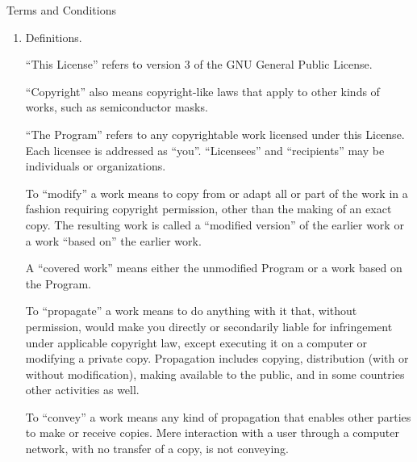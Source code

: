 \documentclass[10pt]{article}
\begin{document}
\begin{abstract}
Finally, every program is threatened constantly by software patents.
States should not allow patents to restrict development and use of
software on general-purpose computers, but in those that do, we wish to
avoid the special danger that patents applied to a free program could
make it effectively proprietary.  To prevent this, the GPL assures that
patents cannot be used to render the program non-free.

The precise terms and conditions for copying, distribution and
modification follow.
\end{abstract}

\begin{center}
{\Large \sc Terms and Conditions}
\end{center}


\begin{enumerate}

\addtocounter{enumi}{-1}

\item Definitions.

``This License'' refers to version 3 of the GNU General Public License.

``Copyright'' also means copyright-like laws that apply to other kinds of
works, such as semiconductor masks.

``The Program'' refers to any copyrightable work licensed under this
License.  Each licensee is addressed as ``you''.  ``Licensees'' and
``recipients'' may be individuals or organizations.

To ``modify'' a work means to copy from or adapt all or part of the work
in a fashion requiring copyright permission, other than the making of an
exact copy.  The resulting work is called a ``modified version'' of the
earlier work or a work ``based on'' the earlier work.

A ``covered work'' means either the unmodified Program or a work based
on the Program.

To ``propagate'' a work means to do anything with it that, without
permission, would make you directly or secondarily liable for
infringement under applicable copyright law, except executing it on a
computer or modifying a private copy.  Propagation includes copying,
distribution (with or without modification), making available to the
public, and in some countries other activities as well.

To ``convey'' a work means any kind of propagation that enables other
parties to make or receive copies.  Mere interaction with a user through
a computer network, with no transfer of a copy, is not conveying.


\end{enumerate}
\end{document}
